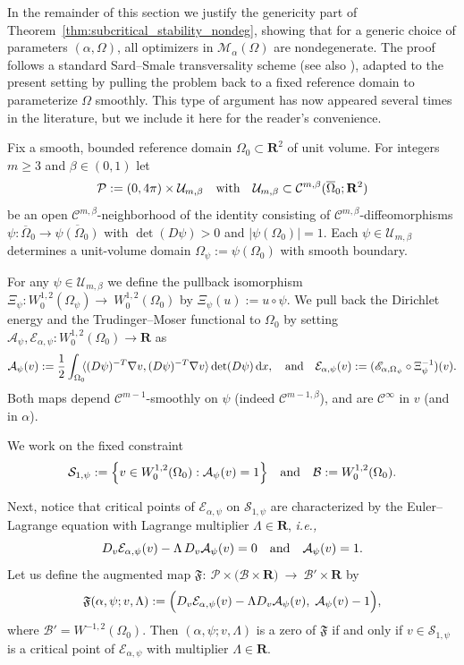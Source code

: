 \documentclass[reqno,11pt]{amsart}
\theoremstyle{definition}
\newcommand{\ud}{\,\mathrm{d}}
\begin{document}
In the remainder of this section we justify the genericity part 
of Theorem~\ref{thm:subcritical_stability_nondeg}, showing that
for a generic choice of parameters $(\alpha,\Omega)$, all optimizers in $\mathcal{M}_\alpha(\Omega)$
are nondegenerate. 
The proof follows a standard Sard--Smale transversality scheme \cite{MR185604} 
(see also \cite{MR2560131,MR2982783}), adapted
to the present setting by pulling the problem back to a fixed reference domain to
parameterize $\Omega$ smoothly. This type of argument has now 
appeared several times in the literature, but we include it here for the 
reader's convenience. 


Fix a smooth, bounded reference domain $\Omega_0\subset\mathbf{R}^2$ of unit volume.
For integers $m\ge 3$ and $\beta\in(0,1)$ let
\[
\mathcal{P}:=(0,4\pi)\times \mathcal{U}_{m,\beta} \quad {\rm with} \quad
\mathcal{U}_{m,\beta}\subset \mathcal{C}^{m,\beta}(\overline{\Omega}_0;\mathbf{R}^2)
\]
be an open $\mathcal{C}^{m,\beta}$-neighborhood of the identity consisting of $\mathcal{C}^{m,\beta}$-diffeomorphisms
$\psi:\overline{\Omega}_0\to\overline{\psi(\Omega_0)}$ with $\det (D\psi)>0$ and
$|\psi(\Omega_0)|=1$. Each $\psi\in\mathcal{U}_{m,\beta}$ determines a unit-volume domain
$\Omega_\psi:=\psi(\Omega_0)$ with smooth boundary.

For any $\psi\in\mathcal{U}_{m,\beta}$ we define the pullback isomorphism
\(\Xi_\psi: W^{1,2}_0(\Omega_\psi) \rightarrow\ W^{1,2}_0(\Omega_0)\) by
\(\Xi_\psi(u):=u\circ\psi\).
We pull back the Dirichlet energy and the
Trudinger--Moser functional to $\Omega_0$ by setting $\mathcal{A}_\psi, \mathcal{E}_{\alpha,\psi}:W^{1,2}_0(\Omega_0)\to \mathbf{R}$ as
\[
\mathcal{A}_\psi(v):=\frac12\int_{\Omega_0}\!\!\langle (D\psi)^{-T}\nabla v, (D\psi)^{-T}\nabla v\rangle \det (D\psi)\ud x,
\quad {\rm and} \quad 
\mathcal{E}_{\alpha,\psi}(v):=(\mathscr{E}_{\alpha,\Omega_\psi}\circ \Xi_\psi^{-1})(v).
\]
Both maps depend $\mathcal{C}^{m-1}$-smoothly on $\psi$ (indeed $\mathcal{C}^{m-1,\beta}$),
and are $\mathcal{C}^\infty$ in $v$ (and in $\alpha$).

We work on the fixed constraint
\[
\mathcal{S}_{1,\psi}:=\Bigl\{v\in W^{1,2}_0(\Omega_0): \mathcal{A}_\psi(v)=1\Bigr\}
\quad {\rm and} \quad
\mathcal{B}:=W^{1,2}_0(\Omega_0).
\]


Next, notice that critical points of $\mathcal{E}_{\alpha,\psi}$ on $\mathcal{S}_{1,\psi}$ are characterized by the
Euler--Lagrange equation with Lagrange multiplier $\Lambda\in\mathbf{R}$, {\it i.e.,}
\[
D_v\mathcal{E}_{\alpha,\psi}(v)-\Lambda\,D_v\mathcal{A}_\psi(v)=0 \quad  {\rm and} \quad \mathcal{A}_\psi(v)=1.
\]
Let us define the augmented map $\mathfrak{F}:\ \mathcal{P}\times \bigl(\mathcal{B}\times\mathbf{R}\bigr)\ \longrightarrow\ 
\mathcal{B}'\times\mathbf{R}$ by
\[
\mathfrak{F}(\alpha,\psi;v,\Lambda):=
\Bigl(D_v\mathcal{E}_{\alpha,\psi}(v)-\Lambda D_v\mathcal{A}_\psi(v),\; \mathcal{A}_\psi(v)-1\Bigr),
\]
where $\mathcal{B}'=W^{-1,2}(\Omega_0)$.
Then $(\alpha,\psi;v,\Lambda)$ is a zero of $\mathfrak{F}$ if and only if $v\in\mathcal{S}_{1,\psi}$ is a
critical point of $\mathcal{E}_{\alpha,\psi}$ with multiplier $\Lambda\in\mathbf{R}$.
\end{document}
